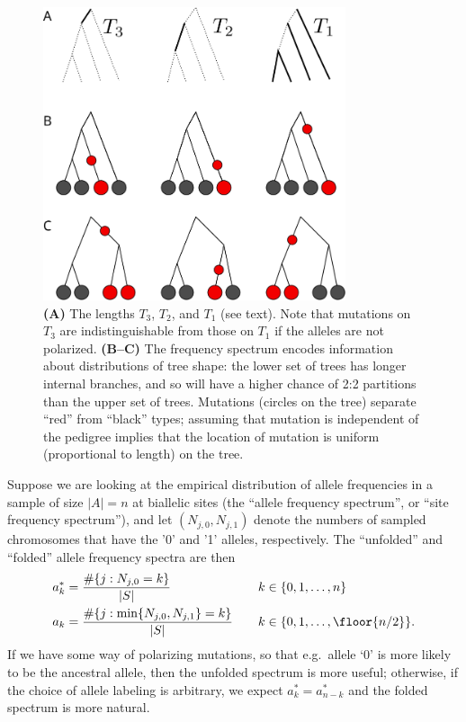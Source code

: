\begin{figure}[ht!]
  \begin{center}
    \includegraphics[width=3.5in]{frequency-spectra-trees}
  \end{center}
  \caption{
  \textbf{(A)} The lengths $T_3$, $T_2$, and $T_1$ (see text).
  Note that mutations on $T_3$ are indistinguishable from those on  $T_1$ if the alleles are not polarized.
  \textbf{(B--C)}
  The frequency spectrum encodes information about distributions of tree shape:
  the lower set of trees has longer internal branches, and so will have a higher chance of 2:2 partitions
  than the upper set of trees.
  Mutations (circles on the tree) separate ``red'' from ``black'' types;
  assuming that mutation is independent of the pedigree implies
  that the location of mutation is uniform (proportional to length) on the tree.
  \label{fig:frequency_spectra_trees}
  }
\end{figure}

Suppose we are looking at the empirical distribution of allele frequencies in a sample of size $|A|=n$
at biallelic sites
(the ``allele frequency spectrum'', or ``site frequency spectrum''),
and let $(N_{j,0},N_{j,1})$ denote the numbers of sampled chromosomes that have the '0' and '1' alleles, respectively.
The ``unfolded'' and ``folded'' allele frequency spectra are then
\begin{align}
  a_k^* &= \frac{ \#\{ j : N_{j,0} = k \} }{ |S| } \quad & k &\in \{0,1,\ldots,n\} \\
  a_k &= \frac{ \#\{ j : \min\{N_{j,0},N_{j,1}\} = k \} }{ |S| } \quad & k &\in \{0,1,\ldots,\floor{n/2}\} .
\end{align}
If we have some way of polarizing mutations, so that e.g.\ allele `0' is more likely to be the ancestral allele,
then the unfolded spectrum is more useful;
otherwise, if the choice of allele labeling is arbitrary, 
we expect $a_k^* = a_{n-k}^*$ and the folded spectrum is more natural.

